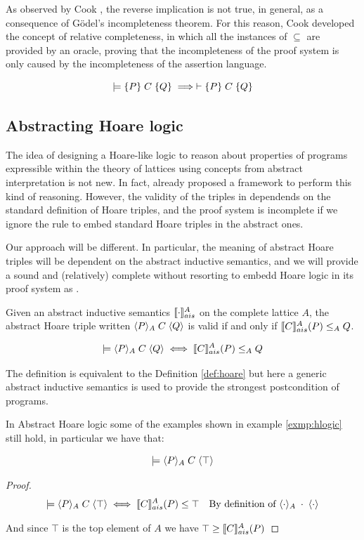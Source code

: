 \documentclass[
  10pt,       %
  twoside,    %
  a4paper,    %
  english,    %
  tikz,       %
  openright,  %
]{book}
\begin{document}
As observed by Cook \cite{Cook78}, the reverse implication is not true, in 
general, as a consequence of Gödel's incompleteness theorem. For this reason, 
Cook developed the concept of relative completeness, in which all the instances 
of $\subseteq$ are provided by an oracle, proving that the incompleteness of the 
proof system is only caused by the incompleteness of the assertion language.

\begin{theorem}
  \label{thm:hlogic-complete}
  $$\models \{ P \} \; C \; \{ Q \} \implies \vdash \{ P \} \; C \; \{ Q \}$$
\end{theorem}

\subsection{Abstracting Hoare logic}
The idea of designing a Hoare-like logic to reason about properties of programs
expressible within the theory of lattices using concepts from abstract
interpretation is not new. In fact, \cite{Cousot12} already proposed a
framework to perform this kind of reasoning. However, the validity of the
triples in \cite{Cousot12} dependends on the standard definition of Hoare
triples, and the proof system is incomplete if we ignore the rule to embed
standard Hoare triples in the abstract ones.

Our approach will be different. In particular, the meaning of abstract Hoare 
triples will be dependent on the abstract inductive semantics, and we will 
provide a sound and (relatively) complete without resorting to embedd Hoare 
logic in its proof system as \cite{Cousot12}.

\begin{definition}
  \label{def:aht}
  Given an abstract inductive semantics $\llbracket \cdot \rrbracket_{ais}^{A}$ on the complete lattice
  $A$, the abstract Hoare triple written $\langle P \rangle_{A} \; C \; \langle Q \rangle$ is valid if
  and only if $\llbracket C \rrbracket_{ais}^{A}(P) \leq_A Q$.

  $$\models \langle P \rangle_{A} \; C \; \langle Q \rangle \iff \llbracket C \rrbracket_{ais}^{A}(P) \leq_A Q$$
\end{definition}

The definition is equivalent to the Definition \ref{def:hoare} 
but here a generic abstract inductive semantics is used to provide the strongest 
postcondition of programs.

In Abstract Hoare logic some of the examples shown in example \ref{exmp:hlogic} 
still hold, in particular we have that:
\begin{example}
  $$\models \langle P \rangle_{A} \; C \; \langle \top \rangle$$
\end{example}
\begin{proof}
  \begin{align*}
    \models \langle P \rangle_{A} \; C \; \langle \top \rangle
      & \iff \llbracket C \rrbracket_{ais}^{A}(P) \leq \top & \text{By definition of $\langle \cdot \rangle_{A} \; \cdot \; \langle \cdot \rangle$} \\
  \end{align*}

  And since $\top$ is the top element of $A$ we have $\top \geq \llbracket C \rrbracket_{ais}^{A}(P)$
\end{proof}
\end{document}
